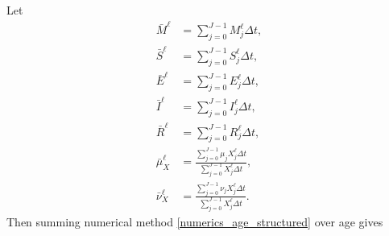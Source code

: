\documentclass[USenglish]{article}
\begin{document}
Let
\begin{subequations}
  \begin{align}
    \bar{M}^{\ell}
    &= \sum_{j = 0}^{J - 1} M_j^{\ell} \Delta t,
    \\
    \bar{S}^{\ell}
    &= \sum_{j = 0}^{J - 1} S_j^{\ell} \Delta t,
    \\
    \bar{E}^{\ell}
    &= \sum_{j = 0}^{J - 1} E_j^{\ell} \Delta t,
    \\
    \bar{I}^{\ell}
    &= \sum_{j = 0}^{J - 1} I_j^{\ell} \Delta t,
    \\
    \bar{R}^{\ell}
    &= \sum_{j = 0}^{J - 1} R_j^{\ell} \Delta t,
    \\
    \bar{\mu}_X^{\ell}
    &= \frac{\sum_{j = 0}^{J - 1} \mu_j X_j^{\ell} \Delta t}
      {\sum_{j = 0}^{J - 1} X_j^{\ell} \Delta t},
    \\
    \bar{\nu}_X^{\ell}
    &= \frac{\sum_{j = 0}^{J - 1} \nu_j X_j^{\ell} \Delta t}
    {\sum_{j = 0}^{J - 1} X_j^{\ell} \Delta t}.
  \end{align}
\end{subequations}
Then summing numerical method
\eqref{numerics_age_structured} over age gives
\end{document}
